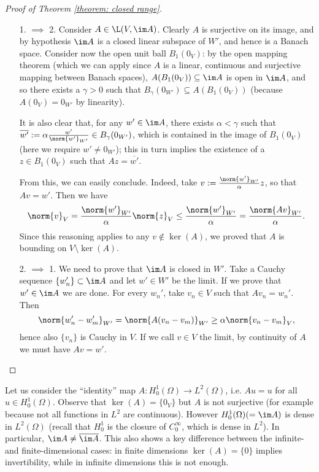 \begin{proof}[Proof of Theorem \eqref{theorem: closed range}]
    \hfill
    \begin{enumerate}[itemindent=25pt]
        \item[1. $\implies$ 2.] Consider $A\in\L(V,\im A)$. Clearly $A$ is surjective on its image, and by hypothesis $\im A$ is a closed linear subspace of $W'$, and hence is a Banach space. Consider now the open unit ball $B_1(0_V)$: by the open mapping theorem (which we can apply since $A$ is a linear, continuous and surjective mapping between Banach spaces), $A(B_1(0_V))\subseteq\im A$ is open in $\im A$, and so there exists a $\gamma>0$ such that $B_\gamma(0_{W'})\subseteq A(B_1(0_V))$ (because $A(0_V)=0_{W'}$ by linearity).\par
        It is also clear that, for any $w'\in \im A$, there exists $\alpha<\gamma$ such that $\overline{w'}:=\alpha\frac{w'}{\norm{w'}_{W'}}\in B_\gamma(0_{W'})$, which is contained in the image of $B_1(0_V)$ (here we require $w'\neq 0_{W'}$); this in turn implies the existence of a $z\in B_1(0_V)$ such that $Az=\overline{w'}$.\par
        From this, we can easily conclude. Indeed, take $v:=\frac{\norm{w'}_{W'}}{\alpha}z$, so that $Av=w'$. Then we have
        \begin{equation*}
            \norm{v}_V=\frac{\norm{w'}_{W'}}{\alpha}\norm{z}_V\leq\frac{\norm{w'}_{W'}}{\alpha}=\frac{\norm{Av}_{W'}}{\alpha}.
        \end{equation*}
        Since this reasoning applies to any $v\not\in\ker(A)$, we proved that $A$ is bounding on $V\setminus\ker(A)$.
        \item[2. $\implies$ 1.] We need to prove that $\im A$ is closed in $W'$. Take a Cauchy sequence $\{w_n'\}\subset \im A$ and let $w'\in W'$ be the limit. If we prove that $w'\in\im A$ we are done. For every $w_n'$, take $v_n\in V$ such that $Av_n=w_n'$. Then
        \begin{equation*}
            \norm{w_n'-w_m'}_{W'}=\norm{A(v_n-v_m)}_{W'}\geq\alpha\norm{v_n-v_m}_V,
        \end{equation*}
        hence also $\{v_n\}$ is Cauchy in $V$. If we call $v\in V$ the limit, by continuity of $A$ we must have $Av=w'$.
    \end{enumerate}
\end{proof}

\begin{example}
    Let us consider the ``identity'' map $A:H_0^1(\Omega)\to L^2(\Omega)$, i.e. $Au=u$ for all $u\in H_0^1(\Omega)$. Observe that $\ker(A)=\{0_V\}$ but $A$ is not surjective (for example because not all functions in $L^2$ are continuous). However $H_0^1(\Omega)(=\im A)$ is dense in $L^2(\Omega)$ (recall that $H_0^1$ is the closure of $C_0^\infty$, which is dense in $L^2$). In particular, $\im A\neq\overline{\im A}$. This also shows a key difference between the infinite- and finite-dimensional cases: in finite dimensions $\ker(A)=\{0\}$ implies invertibility, while in infinite dimensions this is not enough.
\end{example}

